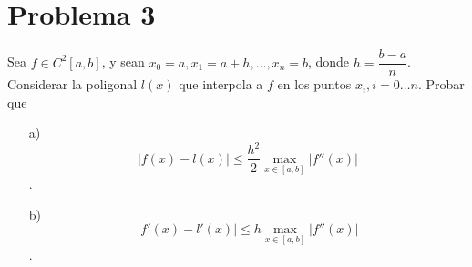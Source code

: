 
\section{Problema 3}
Sea $f \in C^2[a, b]$, y sean $x_0 = a, x_1 = a + h, \dots, x_n = b$, donde $h = \dfrac{b-a}{n}$. Considerar la poligonal $l(x)$ que interpola a $f$ en los puntos $x_i, i = 0 \dots n$. Probar que

\begin{itemize}
    \item[a)]$$|f(x) - l(x)| \leq \frac{h^2}{2} \max_{x \in [a,b]} |f''(x)|$$.
    \item[b)] $$|f'(x) - l'(x)| \leq h \max_{x \in [a,b]} |f''(x)|$$.
\end{itemize}